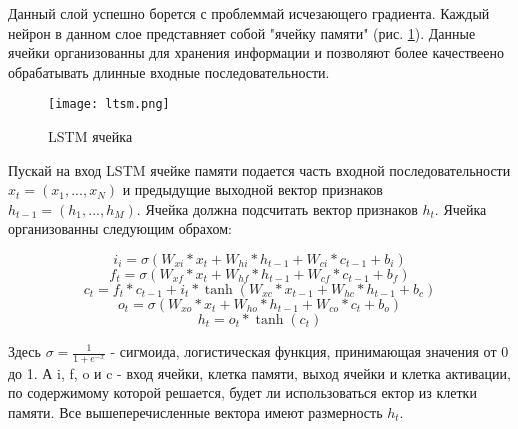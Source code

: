 Данный слой успешно борется с проблеммай исчезающего градиента. Каждый нейрон в данном слое представняет собой "ячейку памяти" (рис. \ref{ris:ltsm}). Данные ячейки организованны для хранения информации и позволяют более качествеено обрабатывать длинные входные последовательности.

\begin{figure}[h]
\begin{center}
	\texttt{[image: ltsm.png]}
	\caption{LSTM ячейка}
	\label{ris:ltsm}
\end{center}
\end{figure}


Пускай на вход LSTM ячейке памяти подается часть входной последовательности $x_t = (x_1, ..., x_N)$ и предыдущие выходной вектор признаков $h_{t-1} = (h_1, ..., h_M)$. Ячейка должна подсчитать вектор признаков $h_t$. Ячейка организованны следующим обрахом:


\begin{equation}
	i_i = \sigma(W_{xi}*x_t+W_{hi}*h_{t-1}+W_{ci}*c_{t-1}+b_i)
\end{equation}
\begin{equation}
	f_t = \sigma(W_{xf}*x_t+W_{hf}*h_{t-1}+W_{cf}*c_{t-1}+b_f)
\end{equation}
\begin{equation}
	c_t = f_t*c_{t-1}+i_t*\tanh(W_{xc}*x_{t-1}+W_{hc}*h_{t-1}+b_c)
\end{equation}
\begin{equation}
	o_t = \sigma(W_{xo}*x_t+W_{ho}*h_{t-1}+W_{co}*c_t+b_o)
\end{equation}
\begin{equation}
	h_t = o_t*\tanh(c_t)
\end{equation}

Здесь $\sigma = \frac{1}{1+e^{-x}} $ - сигмоида, логистическая функция, принимающая значения от 0 до 1. А i, f, o и c - вход ячейки, клетка памяти, выход ячейки и клетка активации, по содержимому которой решается, будет ли использоваться ектор из клетки памяти. Все вышеперечисленные вектора имеют размерность $h_t$.

